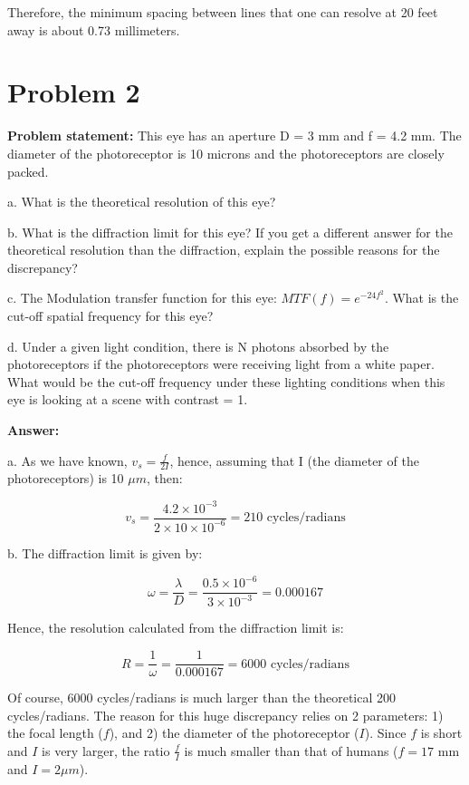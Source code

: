 \documentclass[letterpaper, 11pt]{article}
\begin{document}
Therefore, the minimum spacing between lines that one can resolve at 20 feet away is about 0.73 millimeters.

\section{Problem 2}
\label{sec:prob2}
\textbf{Problem statement:} This eye has an aperture D = 3 mm and f = 4.2 mm. The diameter of the photoreceptor is 10 microns and the photoreceptors are closely packed.

a. What is the theoretical resolution of this eye?

b. What is the diffraction limit for this eye? If you get a different answer for the theoretical resolution than the diffraction, explain the possible reasons for the discrepancy?

c. The Modulation transfer function for this eye: $MTF(f) = e^{-24f^2}$. What is the cut-off spatial frequency for this eye?

d. Under a given light condition, there is N photons absorbed by the photoreceptors if the photoreceptors were receiving light from a white paper. What would be the cut-off frequency under these lighting conditions when this eye is looking at a scene with contrast = 1.

\textbf{Answer:}

a. As we have known, $v_s = \frac{f}{2I}$, hence, assuming that I (the diameter of the photoreceptors) is 10 $\mu m$, then:

\begin{equation}
	v_s = \frac{4.2 \times 10^{-3}}{2\times 10\times 10^{-6}} = 210 \text{ cycles/radians}
\end{equation}

b. The diffraction limit is given by:

\begin{equation}
	\omega = \frac{\lambda}{D} = \frac{0.5\times 10^{-6}}{3\times 10^{-3}} = 0.000167
\end{equation}

Hence, the resolution calculated from the diffraction limit is:

\begin{equation}
	R = \frac{1}{\omega} = \frac{1}{0.000167} = 6000 \text{ cycles/radians}
\end{equation}

Of course, 6000 cycles/radians is much larger than the theoretical 200 cycles/radians. The reason for this huge discrepancy relies on 2 parameters: 1) the focal length ($f$), and 2) the diameter of the photoreceptor ($I$). Since $f$ is short and $I$ is very larger, the ratio $\frac{f}{I}$ is much smaller than that of humans ($f = 17 \text{ mm}$ and $I = 2 \mu m$). 
\end{document}
